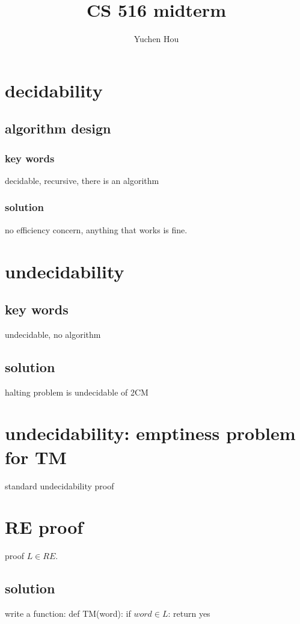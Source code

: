 \documentclass{article}
\begin{document}
\lstset{language=python}
\title{CS 516 midterm}
\author{Yuchen Hou}
\maketitle

\section{decidability}

\subsection{algorithm design}

\subsubsection{key words}
decidable, recursive, there is an algorithm

\subsubsection{solution}
no efficiency concern, anything that works is fine.

\section{undecidability}

\subsection{key words}
undecidable, no algorithm

\subsection{solution}
halting problem is undecidable of 2CM

\section{undecidability: emptiness problem for TM}
standard undecidability proof

\section{RE proof}
proof $ L \in RE $.

\subsection{solution}
write a function:
def TM(word):
	if $ word \in L $:
		return yes
\end{document}
